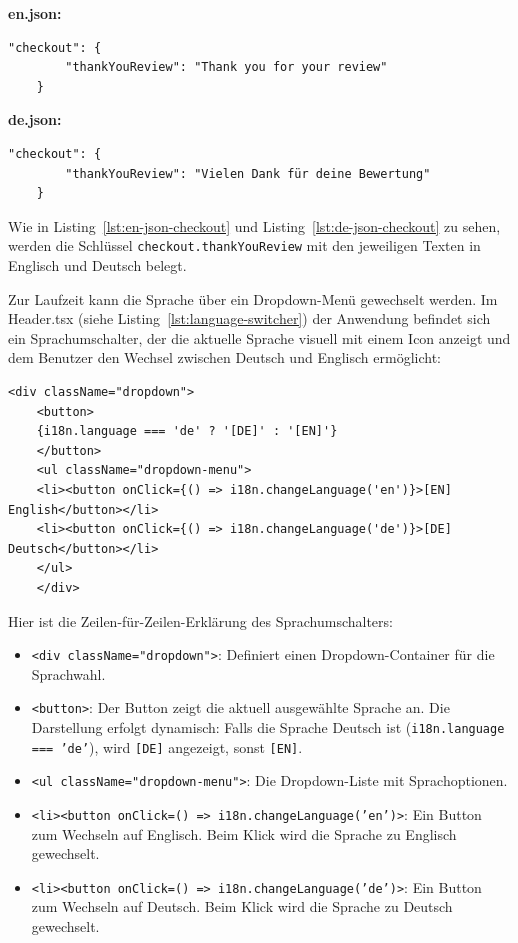 \textbf{en.json:}
\begin{lstlisting}[style=pseudocode, caption={Englische Übersetzung in \texttt{en.json}}, label={lst:en-json-checkout}]
	"checkout": {
		"thankYouReview": "Thank you for your review"
	}
\end{lstlisting}

\textbf{de.json:}
\begin{lstlisting}[style=pseudocode, caption={Deutsche Übersetzung in \texttt{de.json}}, label={lst:de-json-checkout}]
	"checkout": {
		"thankYouReview": "Vielen Dank für deine Bewertung"
	}
\end{lstlisting}

\noindent Wie in Listing~\ref{lst:en-json-checkout} und Listing~\ref{lst:de-json-checkout} zu sehen, werden die Schlüssel \texttt{checkout.thankYouReview} mit den jeweiligen Texten in Englisch und Deutsch belegt.


\noindent Zur Laufzeit kann die Sprache über ein Dropdown-Menü gewechselt werden. Im Header.tsx  (siehe Listing~\ref{lst:language-switcher}) der Anwendung befindet sich ein Sprachumschalter, der die aktuelle Sprache visuell mit einem Icon anzeigt und dem Benutzer den Wechsel zwischen Deutsch und Englisch ermöglicht:

\begin{lstlisting}[style=pseudocode, caption={Sprachumschalter im Header}, label={lst:language-switcher}]
	<div className="dropdown">
	<button>
	{i18n.language === 'de' ? '[DE]' : '[EN]'}
	</button>
	<ul className="dropdown-menu">
	<li><button onClick={() => i18n.changeLanguage('en')}>[EN] English</button></li>
	<li><button onClick={() => i18n.changeLanguage('de')}>[DE] Deutsch</button></li>
	</ul>
	</div>
\end{lstlisting}

\noindent Hier ist die Zeilen-für-Zeilen-Erklärung des Sprachumschalters:
\begin{itemize}
	\item \texttt{\textless{}div className="dropdown"\textgreater{}}: Definiert einen Dropdown-Container für die Sprachwahl.
	\item \texttt{\textless{}button\textgreater{}}: Der Button zeigt die aktuell ausgewählte Sprache an.  
	Die Darstellung erfolgt dynamisch: Falls die Sprache Deutsch ist (\texttt{i18n.language === 'de'}), wird \texttt{[DE]} angezeigt, sonst \texttt{[EN]}.
	\item \texttt{\textless{}ul className="dropdown-menu"\textgreater{}}: Die Dropdown-Liste mit Sprachoptionen.
	\item \texttt{\textless{}li\textgreater{}\textless{}button onClick={() => i18n.changeLanguage('en')}\textgreater{}}: Ein Button zum Wechseln auf Englisch. Beim Klick wird die Sprache zu Englisch gewechselt.
	\item \texttt{\textless{}li\textgreater{}\textless{}button onClick={() => i18n.changeLanguage('de')}\textgreater{}}: Ein Button zum Wechseln auf Deutsch. Beim Klick wird die Sprache zu Deutsch gewechselt.
\end{itemize}

